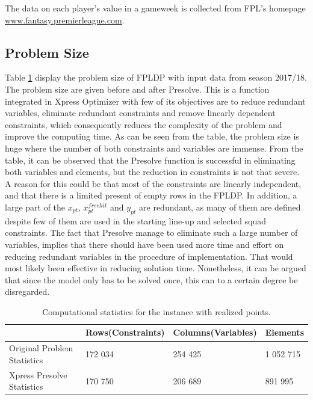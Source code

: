 \newpar

The data on each player's value in a gameweek is collected from FPL's homepage \url{www.fantasy.premierleague.com}. 

\subsection{Problem Size}

Table \ref{tab:computational_statistics} display the problem size of FPLDP with input data from season 2017/18. The problem size are given before and after Presolve. This is a function integrated in Xpress Optimizer with few of its objectives are to reduce redundant variables, eliminate redundant constraints and remove linearly dependent constraints, which consequently reduces the complexity of the problem and improve the computing time. As can be seen from the table, the problem size is huge where the number of both constraints and variables are immense. From the table, it can be observed that the Presolve function is successful in eliminating both variables and elements, but the reduction in constraints is not that severe. A reason for this could be that most of the constraints are linearly independent, and that there is a limited present of empty rows in the FPLDP. In addition, a large part of the $x_{pt}$, $x_{pt}^{freehit}$ and $y_{pt}$ are redundant, as many of them are defined despite few of them are used in the starting line-up and selected squad constraints. The fact that Presolve manage to eliminate such a large number of variables, implies that there should have been used more time and effort on reducing redundant variables in the procedure of implementation. That would most likely been effective in reducing solution time. Nonetheless, it can be argued that since the model only has to be solved once, this can to a certain degree be disregarded. 


\begin{table}[H]
\centering
\caption{Computational statistics for the instance with realized points.}
\label{tab:computational_statistics}
\begin{tabular}{@{}llll@{}}
\toprule
                            & Rows(Constraints)    & Columns(Variables) & Elements \\ \midrule
Original Problem Statistics & 172 034 & 254 425  & 1 052 715  \\
Xpress Presolve Statistics  & 170 750 & 206 689  & 891 995   \\ \bottomrule
\end{tabular}
\end{table}



